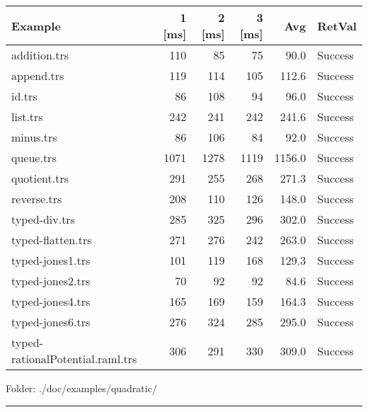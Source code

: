 \documentclass[11pt]{article}
\begin{document}
\begin{center}
\begin{tabular}{lrrrrl}
Example & 1 [ms] & 2 [ms] & 3 [ms] & Avg & RetVal\\
\hline
addition.trs & 110 & 85 & 75 & 90.0 & Success\\
append.trs & 119 & 114 & 105 & 112.6 & Success\\
id.trs & 86 & 108 & 94 & 96.0 & Success\\
list.trs & 242 & 241 & 242 & 241.6 & Success\\
minus.trs & 86 & 106 & 84 & 92.0 & Success\\
queue.trs & 1071 & 1278 & 1119 & 1156.0 & Success\\
quotient.trs & 291 & 255 & 268 & 271.3 & Success\\
reverse.trs & 208 & 110 & 126 & 148.0 & Success\\
typed-div.trs & 285 & 325 & 296 & 302.0 & Success\\
typed-flatten.trs & 271 & 276 & 242 & 263.0 & Success\\
typed-jones1.trs & 101 & 119 & 168 & 129.3 & Success\\
typed-jones2.trs & 70 & 92 & 92 & 84.6 & Success\\
typed-jones4.trs & 165 & 169 & 159 & 164.3 & Success\\
typed-jones6.trs & 276 & 324 & 285 & 295.0 & Success\\
typed-rationalPotential.raml.trs & 306 & 291 & 330 & 309.0 & Success\\
\end{tabular}

\end{center}


Folder: ./doc/examples/quadratic/

\rule{\linewidth}{0.5pt}
\end{document}

